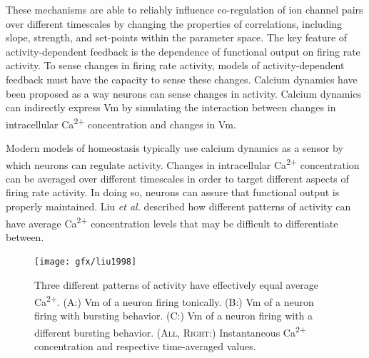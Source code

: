 These mechanisms are able to reliably influence co-regulation of ion channel pairs over different timescales by changing the properties of correlations, including slope, strength, and set-points within the parameter space\cite{stein_modulation_2009,soofi_co-variation_2012,temporal_neuromodulation_2011,tran_ionic_2019}.
The key feature of activity-dependent feedback is the dependence of functional output on firing rate activity. To sense changes in firing rate activity, models of activity-dependent feedback must have the capacity to sense these changes.
Calcium dynamics have been proposed as a way neurons can sense changes in activity. Calcium dynamics can indirectly express \ac{Vm} by simulating the interaction between changes in intracellular Ca\textsuperscript{2+} concentration and changes in \ac{Vm}.

Modern models of homeostasis typically use calcium dynamics as a sensor by which neurons can regulate activity\cite{turrigiano_activity-dependent_1994,turrigiano_selective_1995,oleary_correlations_2013,liu_model_1998}.
Changes in intracellular Ca\textsuperscript{2+} concentration can be averaged over different timescales in order to target different aspects of firing rate activity\cite{liu_model_1998}. In doing so, neurons can assure that functional output is properly maintained.
Liu \textit{et al.} described how different patterns of activity can have average Ca\textsuperscript{2+} concentration levels that may be difficult to differentiate between.

\begin{figure}[H]
    \centering
    \texttt{[image: gfx/liu1998]}
    \caption[Activity pattern differentiation in a single Ca\textsuperscript{2+} sensor setup.]{Three different patterns of activity have effectively equal average Ca\textsuperscript{2+}. (\textsc{A:}) \ac{Vm} of a neuron firing tonically. (\textsc{B:}) \ac{Vm} of a neuron firing with bursting behavior. (\textsc{C:}) \ac{Vm} of a neuron firing with a different bursting behavior. (\textsc{All, Right:}) Instantaneous Ca\textsuperscript{2+} concentration and respective time-averaged values\cite{liu_model_1998}.}
    \label{fig:liu1998}
\end{figure}

